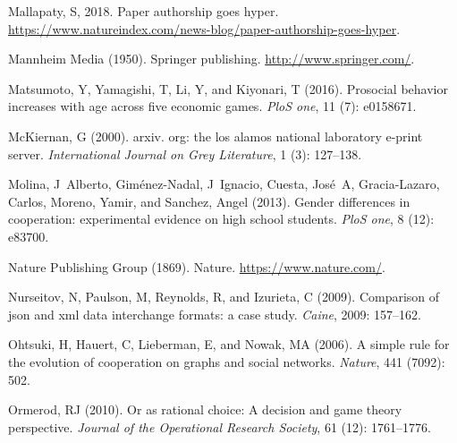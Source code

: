\documentclass{article}
\theoremstyle{definition}
\begin{document}
\begin{thebibliography}{71}
    Mallapaty, S, 2018.
    \newblock Paper authorship goes hyper.
    \newblock
      \url{https://www.natureindex.com/news-blog/paper-authorship-goes-hyper}.
    
    {Mannheim Media} (1950).
    \newblock Springer publishing.
    \newblock \url{http://www.springer.com/}.
    
    Matsumoto, Y, Yamagishi, T, Li, Y, and Kiyonari, T (2016).
    \newblock Prosocial behavior increases with age across five economic games.
    \newblock \emph{PloS one}, 11 (7): e0158671.
    
    McKiernan, G (2000).
    \newblock arxiv. org: the los alamos national laboratory e-print server.
    \newblock \emph{International Journal on Grey Literature}, 1
      (3): 127--138.
    
    Molina, J~Alberto, Gim{\'e}nez-Nadal, J~Ignacio, Cuesta, Jos{\'e}~A,
      Gracia-Lazaro, Carlos, Moreno, Yamir, and Sanchez, Angel (2013).
    \newblock Gender differences in cooperation: experimental evidence on high
      school students.
    \newblock \emph{PloS one}, 8 (12): e83700.
    
    {Nature Publishing Group} (1869).
    \newblock Nature.
    \newblock \url{https://www.nature.com/}.
    
    Nurseitov, N, Paulson, M, Reynolds, R, and Izurieta, C (2009).
    \newblock Comparison of json and xml data interchange formats: a case study.
    \newblock \emph{Caine}, 2009: 157--162.
    
    Ohtsuki, H, Hauert, C, Lieberman, E, and Nowak, MA (2006).
    \newblock A simple rule for the evolution of cooperation on graphs and social
      networks.
    \newblock \emph{Nature}, 441 (7092): 502.
    
    Ormerod, RJ (2010).
    \newblock Or as rational choice: A decision and game theory perspective.
    \newblock \emph{Journal of the Operational Research Society}, 61
      (12): 1761--1776.
    

\end{thebibliography}
\end{document}
